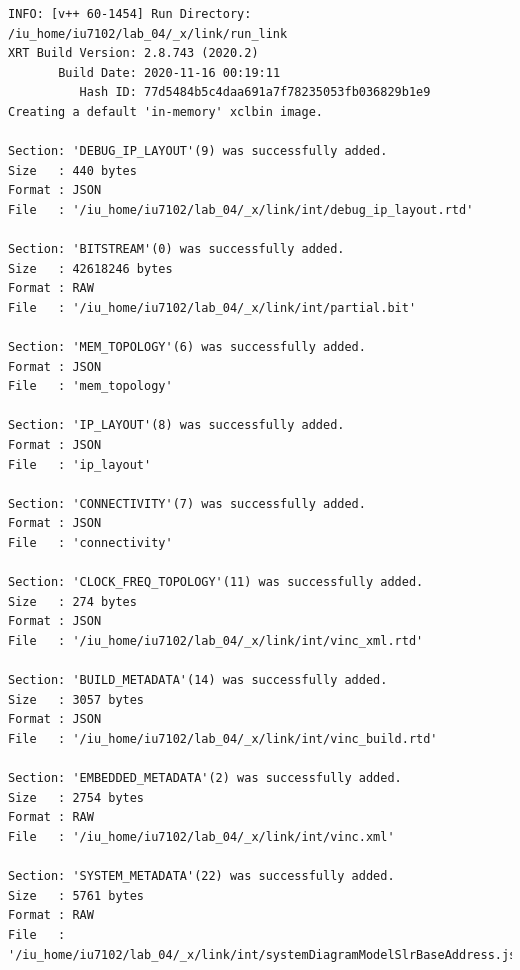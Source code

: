\begin{lstlisting}[label=code, basicstyle=\tiny, caption=Листинг файла v++\_vinc.log]
INFO: [v++ 60-1454] Run Directory: /iu_home/iu7102/lab_04/_x/link/run_link
XRT Build Version: 2.8.743 (2020.2)
       Build Date: 2020-11-16 00:19:11
          Hash ID: 77d5484b5c4daa691a7f78235053fb036829b1e9
Creating a default 'in-memory' xclbin image.

Section: 'DEBUG_IP_LAYOUT'(9) was successfully added.
Size   : 440 bytes
Format : JSON
File   : '/iu_home/iu7102/lab_04/_x/link/int/debug_ip_layout.rtd'

Section: 'BITSTREAM'(0) was successfully added.
Size   : 42618246 bytes
Format : RAW
File   : '/iu_home/iu7102/lab_04/_x/link/int/partial.bit'

Section: 'MEM_TOPOLOGY'(6) was successfully added.
Format : JSON
File   : 'mem_topology'

Section: 'IP_LAYOUT'(8) was successfully added.
Format : JSON
File   : 'ip_layout'

Section: 'CONNECTIVITY'(7) was successfully added.
Format : JSON
File   : 'connectivity'

Section: 'CLOCK_FREQ_TOPOLOGY'(11) was successfully added.
Size   : 274 bytes
Format : JSON
File   : '/iu_home/iu7102/lab_04/_x/link/int/vinc_xml.rtd'

Section: 'BUILD_METADATA'(14) was successfully added.
Size   : 3057 bytes
Format : JSON
File   : '/iu_home/iu7102/lab_04/_x/link/int/vinc_build.rtd'

Section: 'EMBEDDED_METADATA'(2) was successfully added.
Size   : 2754 bytes
Format : RAW
File   : '/iu_home/iu7102/lab_04/_x/link/int/vinc.xml'

Section: 'SYSTEM_METADATA'(22) was successfully added.
Size   : 5761 bytes
Format : RAW
File   : '/iu_home/iu7102/lab_04/_x/link/int/systemDiagramModelSlrBaseAddress.json'


\end{lstlisting}
